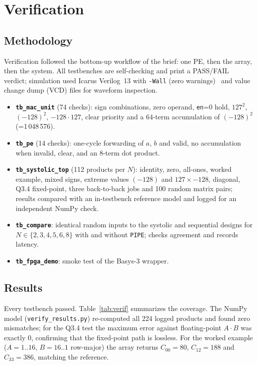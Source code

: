 \documentclass[conference]{IEEEtran}
\begin{document}
\section{Verification}

\subsection{Methodology}
Verification followed the bottom-up workflow of the brief: one PE, then the
array, then the system. All testbenches are self-checking and print a
PASS/FAIL verdict; simulation used Icarus Verilog~13 with
\texttt{-Wall} (zero warnings)~\cite{icarus} and value change dump (VCD)
files for waveform inspection.
\begin{itemize}\setlength{\itemsep}{1pt}
\item \textbf{\texttt{tb\_mac\_unit}} (74 checks): sign combinations, zero
  operand, \texttt{en}=0 hold, $127^2$, $(-128)^2$, $-128\cdot127$, clear
  priority and a 64-term accumulation of $(-128)^2$ (=1\,048\,576).
\item \textbf{\texttt{tb\_pe}} (14 checks): one-cycle forwarding of $a$, $b$
  and valid, no accumulation when invalid, clear, and an 8-term dot product.
\item \textbf{\texttt{tb\_systolic\_top}} (112 products per $N$): identity,
  zero, all-ones, worked example, mixed signs, extreme values $(-128)$ and
  $127\times-128$, diagonal, Q3.4 fixed-point, three back-to-back jobs and 100
  random matrix pairs; results compared with an in-testbench reference model
  and logged for an independent NumPy check.
\item \textbf{\texttt{tb\_compare}}: identical random inputs to the systolic
  and sequential designs for $N\in\{2,3,4,5,6,8\}$ with and without
  \texttt{PIPE}; checks agreement and records latency.
\item \textbf{\texttt{tb\_fpga\_demo}}: smoke test of the Basys-3 wrapper.
\end{itemize}

\subsection{Results}
Every testbench passed. Table~\ref{tab:verif} summarizes the coverage. The
NumPy~\cite{numpy} model (\texttt{verify\_results.py}) re-computed all 224 logged products
and found zero mismatches; for the Q3.4 test the maximum error against
floating-point $A\cdot B$ was exactly 0, confirming that the fixed-point path
is lossless. For the worked example ($A=1..16$, $B=16..1$ row-major) the array
returns $C_{00}=80$, $C_{12}=188$ and $C_{33}=386$, matching the reference.
\end{document}
